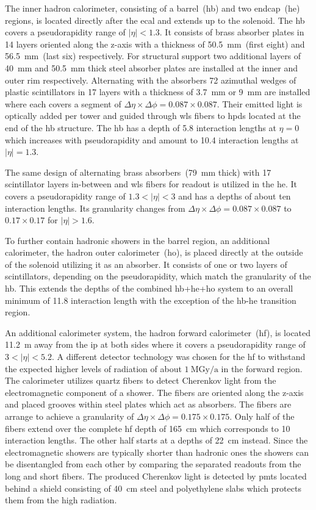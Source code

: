 The inner hadron calorimeter, consisting of a barrel~(\gls{hb}) and two endcap~(\gls{he}) regions, is located directly after the \gls{ecal} and extends up to the solenoid. The \gls{hb} covers a pseudorapidity range of $|\eta|<1.3$. It consists of brass absorber plates in 14 layers oriented along the z-axis with a thickness of 50.5~mm~(first eight) and 56.5~mm~(last six) respectively. For structural support two additional layers of 40~mm and 50.5~mm thick steel absorber plates are installed at the inner and outer rim respectively. Alternating with the absorbers 72 azimuthal wedges of plastic scintillators in 17 layers with a thickness of 3.7~mm or 9~mm are installed where each covers a segment of $\Delta\eta\times\Delta\phi=0.087\times0.087$. Their emitted light is optically added per tower and guided through \gls{wls} fibers to \glspl{hpd} located at the end of the \gls{hb} structure. The \gls{hb} has a depth of 5.8 interaction lengths at $\eta=0$ which increases with pseudorapidity and amount to 10.4 interaction lengths at $|\eta|=1.3$. 

The same design of alternating brass absorbers~(79~mm thick) with 17 scintillator layers in-between and \gls{wls} fibers for readout is utilized in the \gls{he}. It covers a pseudorapidity range of $1.3<|\eta|<3$ and has a depths of about ten interaction lengths. Its granularity changes from $\Delta\eta\times\Delta\phi=0.087\times0.087$ to $0.17\times0.17$ for $|\eta|>1.6$.

To further contain hadronic showers in the barrel region, an additional calorimeter, the hadron outer calorimeter~(\gls{ho}), is placed directly at the outside of the solenoid utilizing it as an absorber. It consists of one or two layers of scintillators, depending on the pseudorapidity, which match the granularity of the \gls{hb}. This extends the depths of the combined \gls{hb}+\gls{he}+\gls{ho} system to an overall minimum of 11.8 interaction length with the exception of the \gls{hb}-\gls{he} transition region.

An additional calorimeter system, the hadron forward calorimeter~(\gls{hf}), is located 11.2~m away from the \gls{ip} at both sides where it covers a pseudorapidity range of $3<|\eta|<5.2$. A different detector technology was chosen for the \gls{hf} to withstand the expected higher levels of radiation of about $1~\mathrm{MGy/a}$ in the forward region. The calorimeter utilizes quartz fibers to detect Cherenkov light from the electromagnetic component of a shower. The fibers are oriented along the z-axis and placed grooves within steel plates which act as absorbers. The fibers are arrange to achieve a granularity of $\Delta\eta\times\Delta\phi=0.175\times0.175$. Only half of the fibers extend over the complete \gls{hf} depth of 165~cm which corresponds to 10 interaction lengths. The other half starts at a depths of 22~cm instead. Since the electromagnetic showers are typically shorter than hadronic ones the showers can be disentangled from each other by comparing the separated readouts from the long and short fibers. The produced Cherenkov light is detected by \glspl{pmt} located behind a shield consisting of 40~cm steel and polyethylene slabs which protects them from the high radiation.
  


